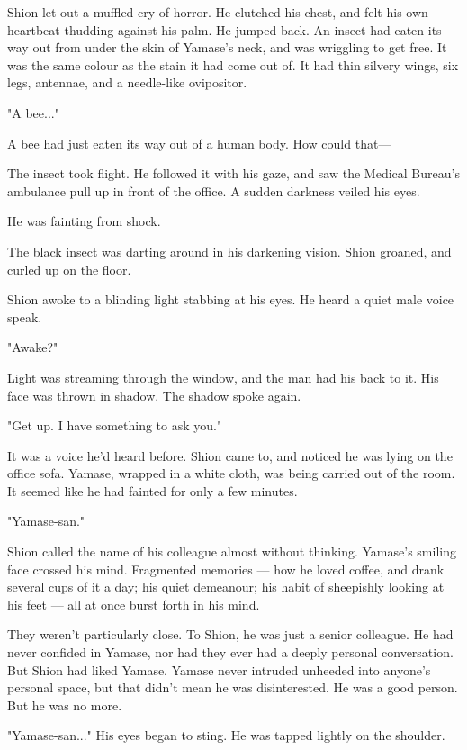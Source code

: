 Shion let out a muffled cry of horror. He clutched his chest, and felt
his own heartbeat thudding against his palm. He jumped back. An insect
had eaten its way out from under the skin of Yamase's neck, and was
wriggling to get free. It was the same colour as the stain it had come
out of. It had thin silvery wings, six legs, antennae, and a needle-like
ovipositor.

"A bee..."

A bee had just eaten its way out of a human body. How could that---

The insect took flight. He followed it with his gaze, and saw the
Medical Bureau's ambulance pull up in front of the office. A sudden
darkness veiled his eyes.

He was fainting from shock.

The black insect was darting around in his darkening vision. Shion
groaned, and curled up on the floor.

\myspace

Shion awoke to a blinding light stabbing at his eyes. He heard a quiet
male voice speak.

"Awake?"

Light was streaming through the window, and the man had his back to it.
His face was thrown in shadow. The shadow spoke again.

"Get up. I have something to ask you."

It was a voice he'd heard before. Shion came to, and noticed he was
lying on the office sofa. Yamase, wrapped in a white cloth, was being
carried out of the room. It seemed like he had fainted for only a few
minutes.

"Yamase-san."

Shion called the name of his colleague almost without thinking. Yamase's
smiling face crossed his mind. Fragmented memories --- how he loved
coffee, and drank several cups of it a day; his quiet demeanour; his
habit of sheepishly looking at his feet --- all at once burst forth in his
mind.

They weren't particularly close. To Shion, he was just a senior
colleague. He had never confided in Yamase, nor had they ever had a
deeply personal conversation. But Shion had liked Yamase. Yamase never
intruded unheeded into anyone's personal space, but that didn't mean he
was disinterested. He was a good person. But he was no more.

"Yamase-san..." His eyes began to sting. He was tapped lightly on the
shoulder.

